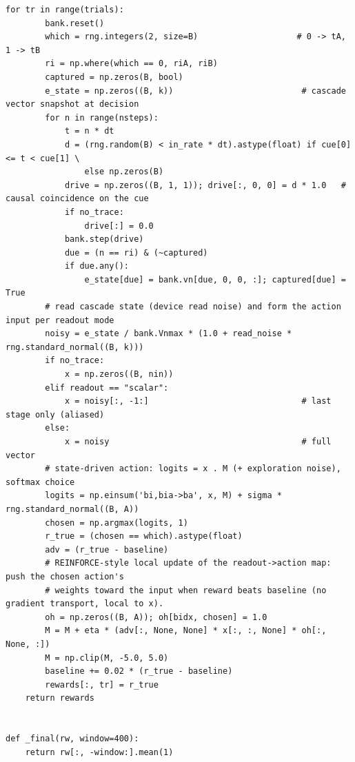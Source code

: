 \begin{lstlisting}[caption={mrl\_trace/selectivity.py},label={lst:siox-src-selectivity}]
    for tr in range(trials):
        bank.reset()
        which = rng.integers(2, size=B)                    # 0 -> tA, 1 -> tB
        ri = np.where(which == 0, riA, riB)
        captured = np.zeros(B, bool)
        e_state = np.zeros((B, k))                          # cascade vector snapshot at decision
        for n in range(nsteps):
            t = n * dt
            d = (rng.random(B) < in_rate * dt).astype(float) if cue[0] <= t < cue[1] \
                else np.zeros(B)
            drive = np.zeros((B, 1, 1)); drive[:, 0, 0] = d * 1.0   # causal coincidence on the cue
            if no_trace:
                drive[:] = 0.0
            bank.step(drive)
            due = (n == ri) & (~captured)
            if due.any():
                e_state[due] = bank.vn[due, 0, 0, :]; captured[due] = True
        # read cascade state (device read noise) and form the action input per readout mode
        noisy = e_state / bank.Vnmax * (1.0 + read_noise * rng.standard_normal((B, k)))
        if no_trace:
            x = np.zeros((B, nin))
        elif readout == "scalar":
            x = noisy[:, -1:]                               # last stage only (aliased)
        else:
            x = noisy                                       # full vector
        # state-driven action: logits = x . M (+ exploration noise), softmax choice
        logits = np.einsum('bi,bia->ba', x, M) + sigma * rng.standard_normal((B, A))
        chosen = np.argmax(logits, 1)
        r_true = (chosen == which).astype(float)
        adv = (r_true - baseline)
        # REINFORCE-style local update of the readout->action map: push the chosen action's
        # weights toward the input when reward beats baseline (no gradient transport, local to x).
        oh = np.zeros((B, A)); oh[bidx, chosen] = 1.0
        M = M + eta * (adv[:, None, None] * x[:, :, None] * oh[:, None, :])
        M = np.clip(M, -5.0, 5.0)
        baseline += 0.02 * (r_true - baseline)
        rewards[:, tr] = r_true
    return rewards


def _final(rw, window=400):
    return rw[:, -window:].mean(1)



\end{lstlisting}
